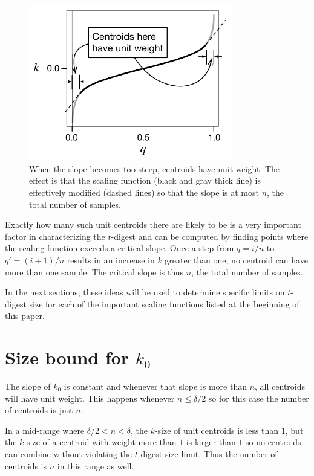 \documentclass[11pt]{amsart}
\begin{document}
\begin{figure}[htbp] %
   \centering
   \includegraphics[width=3.5in]{k-q-diagram/slope-limiting.pdf} 
   \caption{When the slope becomes too steep, centroids have unit weight. The effect is that the scaling function (black and gray thick line) is effectively modified (dashed lines) so that the slope is at most $n$, the total number of samples.  }
   \label{fig:k-q-slope}
\end{figure}
Exactly how many such unit centroids there are likely to be is a very important factor in characterizing the $t$-digest and can be computed by finding points where the scaling function exceeds a critical slope. Once a step from $q=i/n$ to $q'=(i+1)/n$ results in an increase in $k$ greater than one, no centroid can have more than one sample. The critical slope is thus $n$, the total number of samples.

In the next sections, these ideas will be used to determine specific limits on $t$-digest size for each of the important scaling functions listed at the beginning of this paper.

\section{Size bound for $k_0$}
The slope of $k_0$ is constant and whenever that slope is more than $n$, all centroids will have unit weight. This happens whenever $n \le \delta/2 $ so for this case the number of centroids is just $n$. 

In a mid-range where $\delta/2 < n < \delta$, the $k$-size of unit centroids is less than $1$, but the $k$-size of a centroid with weight more than $1$ is larger than $1$ so no centroids can combine without violating the $t$-digest size limit. Thus the number of centroids is $n$ in this range as well.
\end{document}
